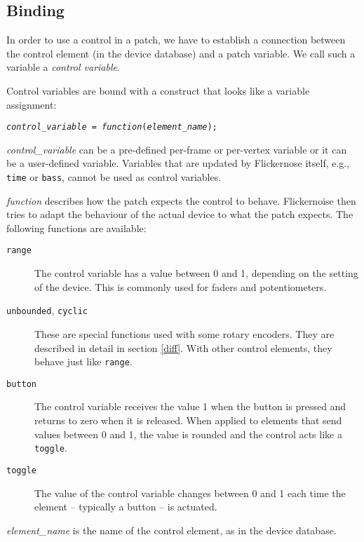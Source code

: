 \documentclass[11pt,a4paper]{article}
\newenvironment{expose}{\vskip3mm\qquad\begin{raggedright}}{%
\end{raggedright}\vskip3mm}
\begin{document}


\subsection{Binding}

In order to use a control in a patch, we have to establish a connection
between the control element (in the device database) and a patch
variable. We call such a variable a {\em control variable}.

Control variables are bound with a construct that looks like a
variable assignment:

\begin{expose}
{\tt {\em control\_variable} = {\em function}({\em element\_name});}
\end{expose}

{\em control\_variable} can be a pre-defined per-frame or per-vertex
variable or it can be a user-defined variable. Variables that are
updated by Flickernose itself, e.g., {\tt time} or {\tt bass}, cannot
be used as control variables.

{\em function} describes how the patch expects the control to behave.
Flickernoise then tries to adapt the behaviour of the actual device
to what the patch expects. The following functions are available:

\begin{description}
  \item[\tt range]
    The control variable has a value between 0 and 1, depending on the
    setting of the device. This is commonly used for faders and
    potentiometers.
  \item[{\tt unbounded}, {\tt cyclic}]
    These are special functions used with some rotary encoders. They
    are described in detail in section \ref{diff}. With other control
    elements, they behave just like {\tt range}.
  \item[\tt button]
    The control variable receives the value 1 when the button is
    pressed and returns to zero when it is released. When applied to
    elements that send values between 0 and 1, the value is rounded
    and the control acts like a {\tt toggle}.
  \item[\tt toggle]
    The value of the control variable changes between 0 and 1 each
    time the element -- typically a button -- is actuated. 
\end{description}

{\em element\_name} is the name of the control element, as in the
device database.
\end{document}
